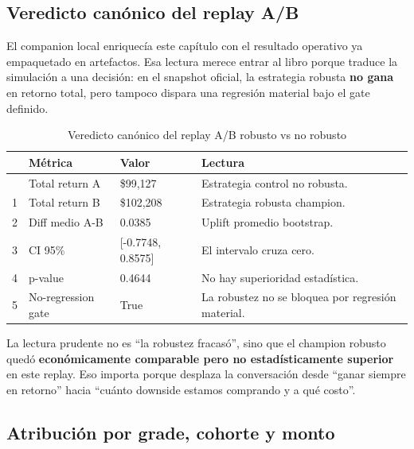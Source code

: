 \documentclass[
  spanish,
  11pt,
  letterpaper,
]{scrbook}
\theoremstyle{plain}
\theoremstyle{remark}
\begin{document}
\subsection{Veredicto canónico del replay
A/B}\label{veredicto-canuxf3nico-del-replay-ab}

El companion local enriquecía este capítulo con el resultado operativo
ya empaquetado en artefactos. Esa lectura merece entrar al libro porque
traduce la simulación a una decisión: en el snapshot oficial, la
estrategia robusta \textbf{no gana} en retorno total, pero tampoco
dispara una regresión material bajo el gate definido.

{

\begin{longtable}[]{@{}llll@{}}

\caption{\label{tbl-ab-official-status}Veredicto canónico del replay A/B
robusto vs no robusto}

\tabularnewline

\toprule\noalign{}
& Métrica & Valor & Lectura \\
\midrule\noalign{}
\endhead
\bottomrule\noalign{}
\endlastfoot
0 & Total return A & \$99,127 & Estrategia control no robusta. \\
1 & Total return B & \$102,208 & Estrategia robusta champion. \\
2 & Diff medio A-B & 0.0385 & Uplift promedio bootstrap. \\
3 & CI 95\% & {[}-0.7748, 0.8575{]} & El intervalo cruza cero. \\
4 & p-value & 0.4644 & No hay superioridad estadística. \\
5 & No-regression gate & True & La robustez no se bloquea por regresión
material. \\

\end{longtable}

}

La lectura prudente no es ``la robustez fracasó'', sino que el champion
robusto quedó \textbf{económicamente comparable pero no estadísticamente
superior} en este replay. Eso importa porque desplaza la conversación
desde ``ganar siempre en retorno'' hacia ``cuánto downside estamos
comprando y a qué costo''.

\subsection{Atribución por grade, cohorte y
monto}\label{atribuciuxf3n-por-grade-cohorte-y-monto}
\end{document}
